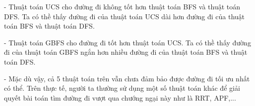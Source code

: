 \documentclass[a4paper, 11pt]{article}
\begin{document}
- Thuật toán UCS cho đường đi không tốt hơn thuật toán BFS và thuật toán DFS. Ta có thề thấy đường đi của thuật toán UCS dài hơn đường đi của thuật toán BFS và thuật toán DFS.

- Thuật toán GBFS cho đường đi tốt hơn thuật toán UCS. Ta có thề thấy đường đi của thuật toán GBFS ngắn hơn nhiều đường đi của thuật toán BFS và thuật toán DFS.

- Mặc dù vậy, cả 5 thuật toán trên vẫn chưa đảm bảo được đường đi tối ưu nhất có thể. Trên thực tế, người ta thường sử dụng một số thuật toán khác để giải quyết bài toán tìm đường đi vượt qua chướng ngại này như là RRT, APF,...
\end{document}

